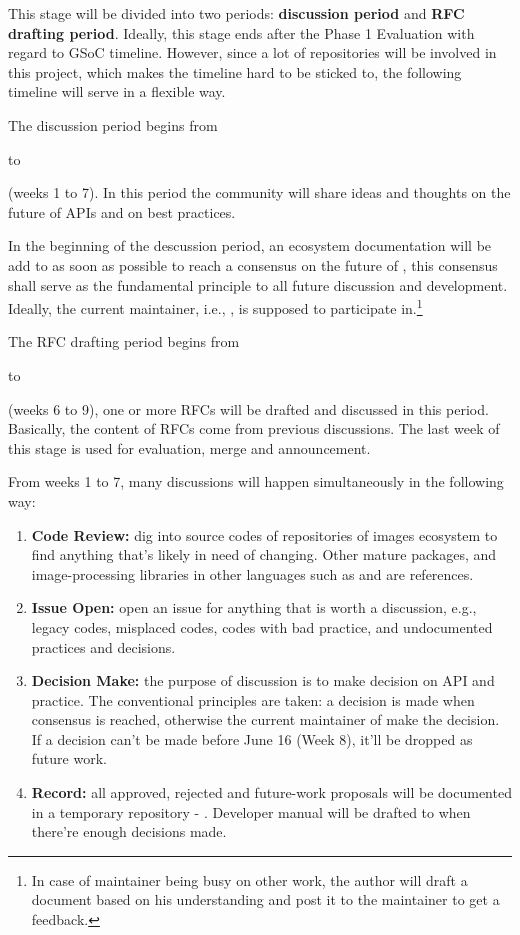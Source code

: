 This stage will be divided into two periods: \textbf{discussion period} and \textbf{RFC drafting period}. Ideally, this stage ends after the \textsf{Phase 1 Evaluation} with regard to GSoC timeline. However, since a lot of repositories will be involved in this project, which makes the timeline hard to be sticked to, the following timeline will serve in a flexible way.\par

The discussion period begins from \date{April 22} to \date{June 9} (weeks 1 to 7). In this period the community will share ideas and thoughts on the future of APIs and on best practices.\par

In the beginning of the descussion period, an ecosystem documentation will be add to \repoimagesgithubio{} as soon as possible to reach a consensus on the future of \images{}, this consensus shall serve as the fundamental principle to all future discussion and development. Ideally, the current \images{} maintainer, i.e., \timholy, is supposed to participate in.\footnote{In case of maintainer being busy on other work, the author will draft a document based on his understanding and post it to the maintainer to get a feedback.}\par

The RFC drafting period begins from \date{May 27} to \date{June 23} (weeks 6 to 9), one or more RFCs will be drafted and discussed in this period. Basically, the content of RFCs come from previous discussions. The last week of this stage is used for evaluation, merge and announcement.\par

From weeks 1 to 7, many discussions will happen simultaneously in the following way:
\begin{enumerate}
    \item \textbf{Code Review:} dig into source codes of repositories of images ecosystem to find anything that's likely in need of changing. Other mature \langjulia{} packages, and image-processing libraries in other languages such as \reposcikitimage{} and \matlabimageprocessing{} are references.
    \item \textbf{Issue Open:} open an issue for anything that is worth a discussion, e.g., legacy codes, misplaced codes, codes with bad practice, and undocumented practices and decisions.
    \item \textbf{Decision Make:} the purpose of discussion is to make decision on API and practice. The conventional principles are taken: a decision is made when consensus is reached, otherwise the current maintainer of \images{} make the decision. If a decision can't be made before June 16 (Week 8), it'll be dropped as future work.
    \item \textbf{Record:} all approved, rejected and future-work proposals will be documented in a temporary repository - \repogsoctempdoc{}. Developer manual will be drafted to \repoimagesgithubio{} when there're enough decisions made.
\end{enumerate}

